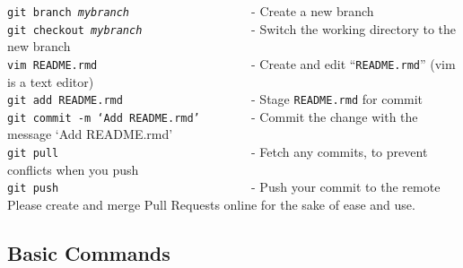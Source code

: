 \documentclass{article}
\begin{document}
\noindent
\texttt{git branch \textit{mybranch}}\verb+                   +- Create a new branch \\
\texttt{git checkout \textit{mybranch}}\verb+                 +- Switch the working directory to the new branch\\
\texttt{vim README.rmd}\verb+                        +- Create and edit ``\texttt{README.rmd}'' (vim is a text editor)\\
\texttt{git add README.rmd}\verb+                    +- Stage \texttt{README.rmd} for commit\\
\texttt{git commit -m `Add README.rmd'}\verb+        +- Commit the change with the message `Add README.rmd'\\
\texttt{git pull}\verb+                              +- Fetch any commits, to prevent conflicts when you push\\
\texttt{git push}\verb+                              +- Push your commit to the remote\\

\noindent
Please create and merge Pull Requests online for the sake of ease and use.

\pagebreak

\subsection{Basic Commands}
\end{document}

